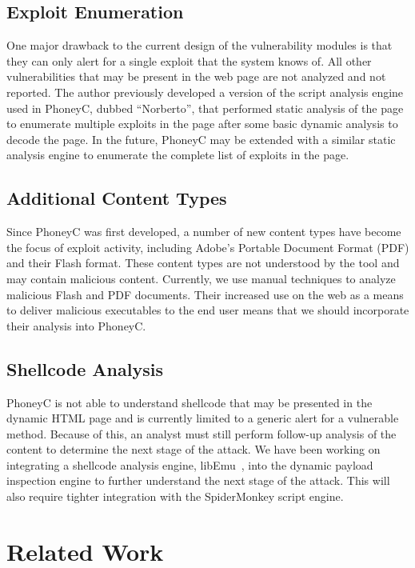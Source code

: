 \documentclass[10pt,twocolumn]{article}
\begin{document}
\subsection{Exploit Enumeration}
\label{exploit-enumeration}

One major drawback to the current design of the vulnerability modules is that they can only alert for a single exploit that the system knows of. All other vulnerabilities that may be present in the web page are not analyzed and not reported. The author previously developed a version of the script analysis engine used in PhoneyC, dubbed ``Norberto'', that performed static analysis of the page to enumerate multiple exploits in the page after some basic dynamic analysis to decode the page. In the future, PhoneyC may be extended with a similar static analysis engine to enumerate the complete list of exploits in the page.

\subsection{Additional Content Types}
\label{add-content}

Since PhoneyC was first developed, a number of new content types have become the focus of exploit activity, including Adobe's Portable Document Format (PDF) and their Flash format. These content types are not understood by the tool and may contain malicious content. Currently, we use manual techniques to analyze malicious Flash and PDF documents. Their increased use on the web as a means to deliver malicious executables to the end user means that we should incorporate their analysis into PhoneyC.

\subsection{Shellcode Analysis}
\label{shellcode}

PhoneyC is not able to understand shellcode that may be presented in the dynamic HTML page and is currently limited to a generic alert for a vulnerable method. Because of this, an analyst must still perform follow-up analysis of the content to determine the next stage of the attack. We have been working on integrating a shellcode analysis engine, libEmu~\cite{libemu}, into the dynamic payload inspection engine to further understand the next stage of the attack. This will also require tighter integration with the SpiderMonkey script engine. 

\section{Related Work}
\label{related-work}
\end{document}
